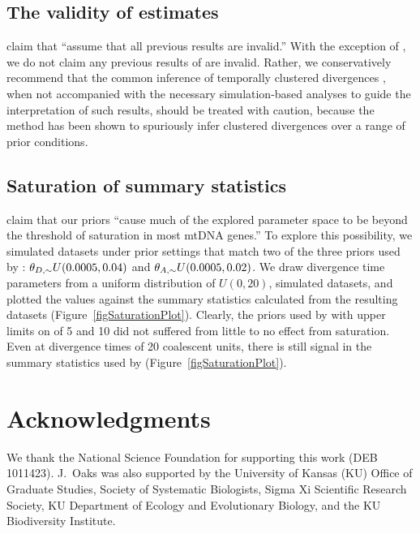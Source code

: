 \documentclass[letterpaper,12pt]{article}
\begin{document}
\begin{linenumbers}
\subsection*{The validity of \msb estimates}
\citet{Hickerson2013} claim that \citet{Oaks2012} ``assume that all previous
\msb results are invalid.''
With the exception of \citet{Hickerson2013}, we do not claim any previous
results of \msb are invalid.
Rather, we conservatively recommend that the common inference of temporally
clustered divergences
\citep{Barber2010, Bell2012, Carnaval2009, Chan2011, Daza2010, Hickerson2006,
    Huang2011, Lawson2010, Leache2007, Plouviez2009, Stone2012, Voje2009},
when not accompanied with the necessary simulation-based analyses to guide the
interpretation of such results, should be treated with caution, because the
method has been shown to spuriously infer clustered divergences over a range of
prior conditions.

\subsection*{Saturation of summary statistics}
\citet{Hickerson2013} claim that our priors ``cause much of the explored
parameter space to be beyond the threshold of saturation in most mtDNA genes.''
To explore this possibility, we simulated datasets under prior settings that
match two of the three priors used by \citet{Oaks2012}: $\meanDescendantTheta
\sim U(0.0005, 0.04)$ and $\ancestralTheta \sim U(0.0005, 0.02)$.
We draw divergence time parameters from a uniform distribution of $U(0, 20)$,
simulated datasets, and plotted the \divt{} values against the summary
statistics calculated from the resulting datasets
(Figure~\ref{figSaturationPlot}).
Clearly, the priors used by \citet{Oaks2012} with upper limits on \divt{} of 5
and 10 did not suffered from little to no effect from saturation.  Even at
divergence times of 20 coalescent units, there is still signal in the summary
statistics used by \msb (Figure~\ref{figSaturationPlot}).



\section*{Acknowledgments}
We thank the National Science Foundation for supporting this work (DEB
1011423).
J.\ Oaks was also supported by the University of Kansas (KU) Office of Graduate
Studies, Society of Systematic Biologists, Sigma Xi Scientific Research
Society, KU Department of Ecology and Evolutionary Biology, and the KU
Biodiversity Institute.


% 

\newpage
\singlespacing

\renewcommand\listfigurename{Figure Captions}
\renewcommand\cftdotsep{\cftnodots}
\setlength\cftbeforefigskip{10pt}
\listoffigures


\end{linenumbers}
\end{document}
